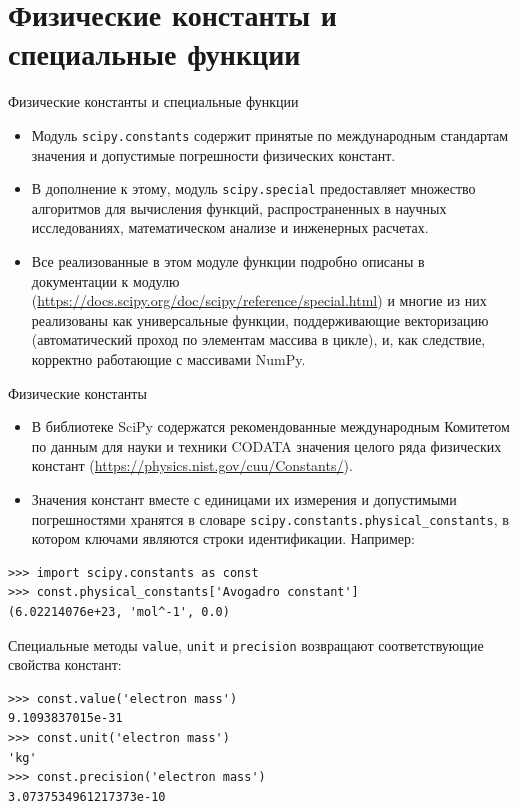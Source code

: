 \documentclass[aspectratio=169, mathserif]{beamer}	%
\begin{document}
\section{Физические константы и \\ специальные функции}
\sectionframe

\begin{frame}[fragile, label=c]{Физические константы и специальные функции}
\scriptsize
\begin{itemize}
	\item Модуль \texttt{scipy.constants} содержит принятые по международным стандартам значения и допустимые погрешности физических констант.
	\item В дополнение к этому, модуль \texttt{scipy.special} предоставляет множество алгоритмов для вычисления функций, распространенных в научных исследованиях, математическом анализе и инженерных расчетах.
	\item Все реализованные в этом модуле функции подробно описаны в документации к модулю (\url{https://docs.scipy.org/doc/scipy/reference/special.html}) и многие из них реализованы как универсальные функции, поддерживающие векторизацию (автоматический проход по элементам массива в цикле), и, как следствие, корректно работающие с массивами NumPy.
\end{itemize}
\vfill
\end{frame}

\begin{frame}[fragile, label=c]{Физические константы}
\scriptsize
\begin{itemize}
	\item В библиотеке SciPy содержатся рекомендованные международным Комитетом по данным для науки и техники CODATA значения целого ряда физических констант (\url{https://physics.nist.gov/cuu/Constants/}).
	\item Значения констант вместе с единицами их измерения и допустимыми погрешностями хранятся в словаре \texttt{scipy.constants.physical\_constants}, в котором ключами являются строки идентификации. Например:
\end{itemize}
\vfill
\begin{verbatim}
>>> import scipy.constants as const
>>> const.physical_constants['Avogadro constant']
(6.02214076e+23, 'mol^-1', 0.0)
\end{verbatim}
\vfill
Специальные методы \texttt{value}, \texttt{unit} и \texttt{precision} возвращают соответствующие свойства констант:
\vfill
\begin{verbatim}
>>> const.value('electron mass')
9.1093837015e-31
>>> const.unit('electron mass')
'kg'
>>> const.precision('electron mass')
3.0737534961217373e-10
\end{verbatim}
\vfill
\end{frame}
\end{document}
